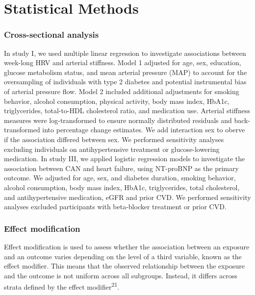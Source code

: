 \documentclass[
  a4paper,
  headsepline=true,
  open=any]{scrbook}
\begin{document}
\hypertarget{statistical-methods}{%
\section{Statistical Methods}\label{statistical-methods}}

\hypertarget{cross-sectional-analysis}{%
\subsubsection{Cross-sectional
analysis}\label{cross-sectional-analysis}}

In study I, we used multiple linear regression to investigate
associations between week-long HRV and arterial stiffness. Model 1
adjusted for age, sex, education, glucose metabolism status, and mean
arterial pressure (MAP) to account for the oversampling of individuals
with type 2 diabetes and potential instrumental bias of arterial
pressure flow. Model 2 included additional adjustments for smoking
behavior, alcohol consumption, physical activity, body mass index,
HbA1c, triglycerides, total-to-HDL cholesterol ratio, and medication
use. Arterial stiffness measures were log-transformed to ensure normally
distributed residuals and back-transformed into percentage change
estimates. We add interaction sex to oberve if the association differed
between sex. We performed sensitivity analyses excluding individuals on
antihypertensive treatment or glucose-lowering medication. In study III,
we applied logistic regression models to investigate the association
between CAN and heart failure, using NT-proBNP as the primary outcome.
We adjusted for age, sex, and diabetes duration, smoking behavior,
alcohol consumption, body mass index, HbA1c, triglycerides, total
cholesterol, and antihypertensive medication, eGFR and prior CVD. We
performed sensitivity analyses excluded participants with beta-blocker
treatment or prior CVD.

\hypertarget{effect-modification}{%
\subsubsection{Effect modification}\label{effect-modification}}

Effect modification is used to assess whether the association between an
exposure and an outcome varies depending on the level of a third
variable, known as the effect modifier. This means that the observed
relationship between the exposure and the outcome is not uniform across
all subgroups. Instead, it differs across strata defined by the effect
modifier\textsuperscript{21}.
\end{document}
